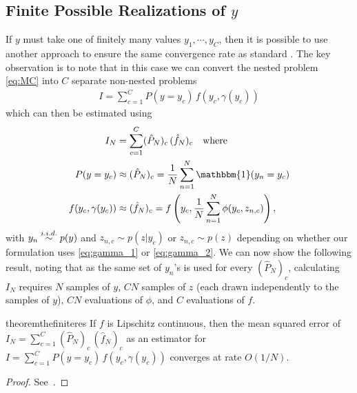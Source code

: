 
\subsection{Finite Possible Realizations of $y$}
\label{sec:discrete}

If $y$ must take one of finitely many values $y_1, \cdots, y_C$, then it is possible to
use another approach to ensure the same convergence rate as standard \mc.
The key observation is to note that in this case we can convert the nested problem
\eqref{eq:MC} into $C$ separate non-nested problems
\begin{align}
         I = \sum_{c=1}^C P(y = y_c) \, f(y_c, \gamma(y_c))
\end{align}
which can then be estimated using
\begin{align}
        I_N  &= \sum_{c=1}^C (\hat{P}_N)_c \, (\hat{f}_N)_c \quad \text{where}
        \label{eq:IN} \\
        \label{eq:PN}
        P(y = y_c) &\approx (\hat{P}_N)_c = \frac{1}{N} \sum_{n=1}^N \mathbbm{1}(y_n = y_c)  \\
        \label{eq:fn}
        f(y_c, \gamma(y_c)) &\approx (\hat{f}_N)_c = f\left(y_c, \frac{1}{N} \sum_{n=1}^N \phi(y_c, z_{n,c})\right),
\end{align}
with $y_n \overset{i.i.d.}{\sim} p(y)$ and $z_{n,c} \sim p(z|y_c)$ or $z_{n,c} \sim p(z)$  
depending on whether our formulation uses
\eqref{eq:gamma_1} or \eqref{eq:gamma_2}.  
We can now show the following result, noting that as the same set of $y_n$'s is used for every
$(\hat{P}_N)_c$, calculating $I_N$ requires $N$ samples of $y$, 
$CN$ samples of $z$ (each
drawn independently to the samples of $y$), $CN$ evaluations of $\phi$, and $C$ evaluations of $f$.
\vspace{-5pt}
\begin{restatable}{theorem}{thefiniteres}
	\label{the:finite-res}
  If $f$ is Lipschitz continuous, then the mean squared error of $I_N  = \sum_{c=1}^C (\hat{P}_N)_c \, (\hat{f}_N)_c$ 
  as an estimator for $I= \sum_{c=1}^C P(y = y_c) \, f(y_c, \gamma(y_c))$ converges at rate $O(1/N)$.
\end{restatable}
\vspace{-12pt}
\begin{proof}
	See~\citep{rainforth2017pitfalls}.
\end{proof}
%
%
